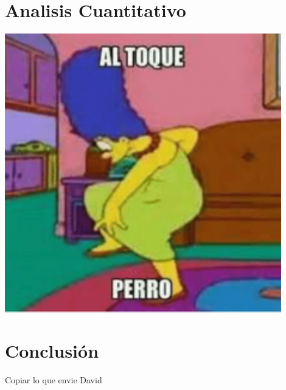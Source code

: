 \documentclass[12pt]{exam}
\newenvironment{Figura}
  {\par\medskip\noindent\minipage{\linewidth}}
  {\endminipage\par\medskip}
\begin{document}
\begin{multicols}{2}
\section{Analisis Cuantitativo}
\begin{Figura}
    \centering
    \includegraphics[width=0.9\textwidth]{Al_toque_perro.png}
    \label{fig}
\end{Figura}
\section{Conclusión}
Copiar lo que envie David
\end{multicols}
\end{document}
